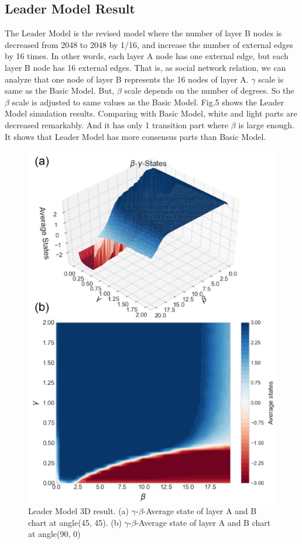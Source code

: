 \documentclass[english]{cccconf}
\begin{document}
\subsection{Leader Model Result}
The Leader Model is the revised model where the number of layer B nodes is decreased from 2048 to 2048 by 1/16, and increase the number of external edges by 16 times. In other words, each layer A node has one external edge, but each layer B node has 16 external edges. That is, as social network relation, we can analyze that one node of layer B represents the 16 nodes of layer A. $\gamma$ scale is same as the Basic Model. But, $\beta$ scale depends on the number of degrees. So the $\beta$ scale is adjusted to same values as the Basic Model. Fig.5 shows the Leader Model simulation results. Comparing with Basic Model, white and light parts are decreased remarkably. And it has only 1 transition part where $\beta$ is large enough. It shows that Leader Model has more consensus parts than Basic Model.
\begin{figure}[!htb]
  \centering
  \includegraphics[width=\hsize]{FIG5.png}
  \caption{Leader Model 3D result. (a) $\gamma$-$\beta$-Average state of layer A and B chart at angle(45, 45). (b) $\gamma$-$\beta$-Average state of layer A and B chart at angle(90, 0)}
  \label{Fig5}
\end{figure}
\end{document}
